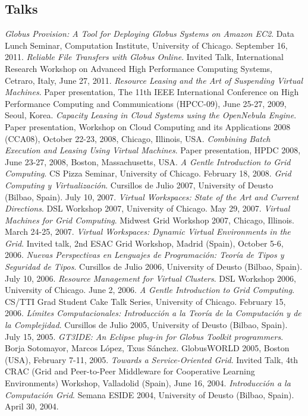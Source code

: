 \documentclass{resume}
\begin{document}
\subsection*{Talks}
\begin{category}{} 
\citembullet \emph{Globus Provision: A Tool for Deploying Globus Systems on Amazon EC2}. Data Lunch Seminar, Computation Institute, University of Chicago. September 16, 2011.
\citembullet \emph{Reliable File Transfers with Globus Online}. Invited Talk, International Research Workshop on Advanced High Performance Computing Systems, Cetraro, Italy, June 27, 2011.
\citembullet \emph{Resource Leasing and the Art of Suspending Virtual Machines}. Paper presentation, The 11th IEEE International Conference on High Performance Computing and Communications (HPCC-09), June 25-27, 2009, Seoul, Korea.
\citembullet \emph{Capacity Leasing in Cloud Systems using the OpenNebula Engine}. Paper presentation, Workshop on Cloud Computing and its Applications 2008 (CCA08), October 22-23, 2008, Chicago, Illinois, USA.
\citembullet \emph{Combining Batch Execution and Leasing Using Virtual Machines}. Paper presentation, HPDC 2008, June 23-27, 2008, Boston, Massachusetts, USA.
\citembullet \emph{A Gentle Introduction to Grid Computing}. CS Pizza Seminar, University of Chicago. February 18, 2008.
\citembullet \emph{Grid Computing y Virtualización}. Cursillos de Julio 2007, University of Deusto (Bilbao, Spain). July 10, 2007.
\citembullet \emph{Virtual Workspaces: State of the Art and Current Directions}. DSL Workshop 2007, University of Chicago. May 29, 2007.
\citembullet \emph{Virtual Machines for Grid Computing}. Midwest Grid Workshop 2007, Chicago, Illinois. March 24-25, 2007.
\citembullet \emph{Virtual Workspaces: Dynamic Virtual Environments in the Grid}. Invited talk, 2nd ESAC Grid Workshop, Madrid (Spain), October 5-6, 2006. 
\citembullet \emph{Nuevas Perspectivas en Lenguajes de Programación: Teoría de Tipos y Seguridad de Tipos}. Cursillos de Julio 2006, University of Deusto (Bilbao, Spain). July 10, 2006.
\citembullet \emph{Resource Management for Virtual Clusters}. DSL Workshop 2006, University of Chicago. June 2, 2006.
\citembullet \emph{A Gentle Introduction to Grid Computing}. CS/TTI Grad Student Cake Talk Series, University of Chicago. February 15, 2006.
\citembullet \emph{Límites Computacionales: Introducción a la Teoría de la Computación y de la Complejidad}. Cursillos de Julio 2005, University of Deusto (Bilbao, Spain). July 15, 2005.
\citembullet \emph{GT3IDE: An Eclipse plug-in for Globus Toolkit programmers}. Borja Sotomayor, Marcos López, Txus Sánchez. GlobusWORLD 2005, Boston (USA), February 7-11, 2005.
\citembullet \emph{Towards a Service-Oriented Grid}. Invited Talk, 4th CRAC (Grid and Peer-to-Peer Middleware for Cooperative Learning Environments) Workshop, Valladolid (Spain), June 16, 2004.
\citembullet \emph{Introducción a la Computación Grid}. Semana ESIDE 2004, University of Deusto (Bilbao, Spain). April 30, 2004. 
\end{category}{}
\end{document}
